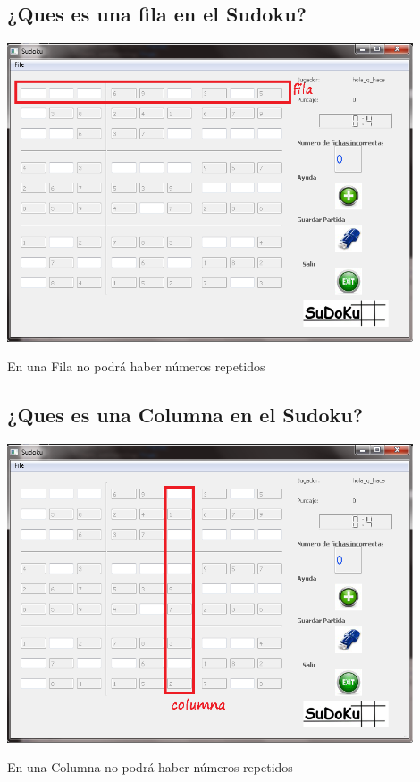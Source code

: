 \documentclass[12pt]{extbook}
\begin{document}
\begin{center}
\section{¿Ques es una fila en el Sudoku?}
\end{center}
\begin{center}
\includegraphics[width=12cm]{fila.png}
\end{center}
En una Fila no podrá haber números repetidos\\

\begin{center}
\section{¿Ques es una Columna en el Sudoku?}
\end{center}
\begin{center}
\includegraphics[width=12cm]{columna.png}
\end{center}
En una Columna no podrá haber números repetidos\\
\end{document}
